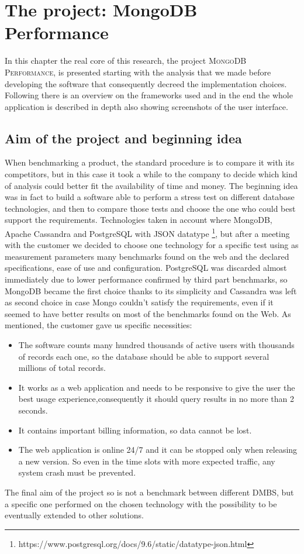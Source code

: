 \chapter{The project: MongoDB Performance}
\label{cha:3}
In this chapter the real core of this research, the project \textsc{MongoDB Performance}, is presented starting with the analysis  that we made before developing the software that consequently decreed the implementation choices.
Following there is an overview on the frameworks used and in the end the whole application is described in depth also showing screenshots of the user interface.

\section{Aim of the project and beginning idea}
\label{sec:1}
When benchmarking a product, the standard procedure is to compare it with its competitors, but in this case it took a while to the company to decide which kind of analysis could better fit the availability of time and money.
The beginning idea was in fact to build a software able to perform a stress test on different database technologies, and then to compare those tests and choose the one who could best support the requirements.
Technologies taken in account where MongoDB, Apache Cassandra and PostgreSQL with JSON datatype \footnote{https://www.postgresql.org/docs/9.6/static/datatype-json.html}, but after a meeting with the customer we decided to choose one technology for a specific test using as measurement parameters many benchmarks found on the web and the declared specifications, ease of use and configuration.
PostgreSQL was discarded almost immediately due to lower performance confirmed by third part benchmarks, so MongoDB became the first choice thanks to its simplicity and Cassandra was left as second choice in case Mongo couldn’t satisfy the requirements, even if it seemed to have better results on most of the benchmarks found on the Web. 
As mentioned, the customer gave us specific necessities:
\begin{itemize}
	\item The software counts many hundred thousands of active users with thousands of records each one, so the database should be able to support several millions of total records.
	\item It works as a web application and needs to be responsive to give the user the best usage experience,consequently it should query results in no more than 2 seconds.
	\item It contains important billing information, so data cannot be lost.
	\item The web application is online 24/7 and it can be stopped only when releasing a new version. So even in the time slots with more expected traffic, any system crash must be prevented.
\end{itemize}
The final aim of the project so is not a benchmark between different DMBS, but a specific one performed on the chosen technology with the possibility to be eventually extended to other solutions.


